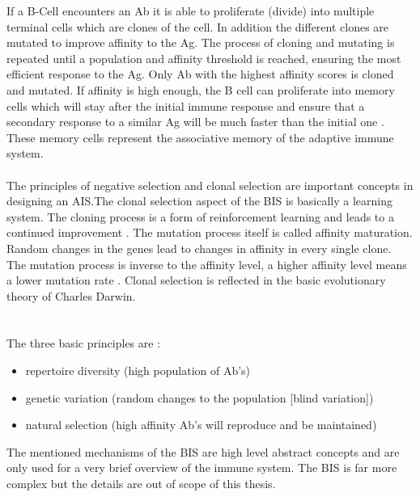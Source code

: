 If a B-Cell encounters an Ab it is able to proliferate (divide) into multiple terminal cells which are clones of the cell. In addition the different clones are mutated to improve affinity to the Ag. The process of cloning and mutating is repeated until a population and affinity threshold is reached, ensuring the most efficient response to the Ag. Only Ab with the highest affinity scores is cloned and mutated. If affinity is high enough, the B cell can proliferate into memory cells which will stay after the initial immune response and ensure that a secondary response to a similar Ag will be much faster than the initial one \cite{DEC02}. These memory cells represent the associative memory of the adaptive immune system. 
\\\\
 The principles of negative selection and clonal selection are important concepts in designing an AIS.The clonal selection aspect of the BIS is basically a learning system. The cloning process is a form of reinforcement learning and leads to a continued improvement \cite{DEC02}.
The mutation process itself is called affinity maturation. Random changes in the genes lead to changes in affinity in every single clone. The mutation process is inverse to the affinity level,  a higher affinity level means a lower mutation rate \cite{DEC02}.  
Clonal selection is reflected in the basic evolutionary theory of Charles Darwin.\\\\\\ The three basic principles are \cite{DEC02}:
\\
\begin{itemize}
	\item 	repertoire diversity (high population of Ab's)
	\item 	genetic variation (random changes to the population [blind variation])
	\item 	natural selection (high affinity Ab's will reproduce and be maintained) 
	
\end{itemize}

The mentioned mechanisms of the BIS are high level abstract concepts and are only used for a very brief overview of the immune system. The BIS is far more complex but the details are out of scope of this thesis.



